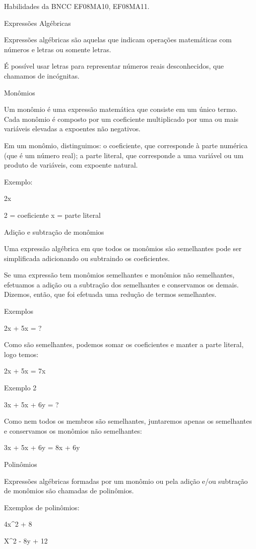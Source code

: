 {Habilidades da BNCC EF08MA10, EF08MA11.

Expressões Algébricas

Expressões algébricas são aquelas que indicam operações matemáticas com
números e letras ou somente letras.

É possível usar letras para representar números reais desconhecidos, que
chamamos de incógnitas.

Monômios

Um monômio é uma expressão matemática que consiste em um único termo.
Cada monômio é composto por um coeficiente multiplicado por uma ou mais
variáveis elevadas a expoentes não negativos.

Em um monômio, distinguimos: o coeficiente, que corresponde à parte
numérica (que é um número real); a parte literal, que corresponde a uma
variável ou um produto de variáveis, com expoente natural.

Exemplo:

2x

2 = coeficiente x = parte literal

Adição e subtração de monômios

Uma expressão algébrica em que todos os monômios são semelhantes pode
ser simplificada adicionando ou subtraindo os coeficientes.

Se uma expressão tem monômios semelhantes e monômios não semelhantes,
efetuamos a adição ou a subtração dos semelhantes e conservamos os
demais. Dizemos, então, que foi efetuada uma redução de termos
semelhantes.

Exemplos

2x + 5x = ?

Como são semelhantes, podemos somar os coeficientes e manter a parte
literal, logo temos:

2x + 5x = 7x

Exemplo 2

3x + 5x + 6y = ?

Como nem todos os membros são semelhantes, juntaremos apenas os
semelhantes e conservamos os monômios não semelhantes:

3x + 5x + 6y = 8x + 6y

Polinômios

Expressões algébricas formadas por um monômio ou pela adição e/ou
subtração de monômios são chamadas de polinômios.

Exemplos de polinômios:

4x^2 + 8

X^2 - 8y + 12

}
